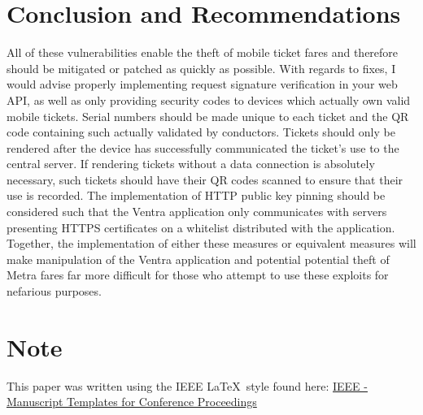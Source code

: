 \documentclass[12pt,conference]{IEEEtran}
\begin{document}
\section{Conclusion and Recommendations}
All of these vulnerabilities enable the theft of mobile ticket fares and therefore should be mitigated or patched as quickly as possible. With regards to fixes, I would advise properly implementing request signature verification in your web API, as well as only providing security codes to devices which actually own valid mobile tickets. Serial numbers should be made unique to each ticket and the QR code containing such actually validated by conductors. Tickets should only be rendered after the device has successfully communicated the ticket's use to the central server. If rendering tickets without a data connection is absolutely necessary, such tickets should have their QR codes scanned to ensure that their use is recorded. The implementation of HTTP public key pinning should be considered such that the Ventra application only communicates with servers presenting HTTPS certificates on a whitelist distributed with the application. Together, the implementation of either these measures or equivalent measures will make manipulation of the Ventra application and potential potential theft of Metra fares far more difficult for those who attempt to use these exploits for nefarious purposes.

\section*{Note}
This paper was written using the IEEE \LaTeX\ style found here: \href{http://www.ieee.org/conferences_events/conferences/publishing/templates.html}{IEEE - Manuscript Templates for Conference Proceedings}

\end{document}
